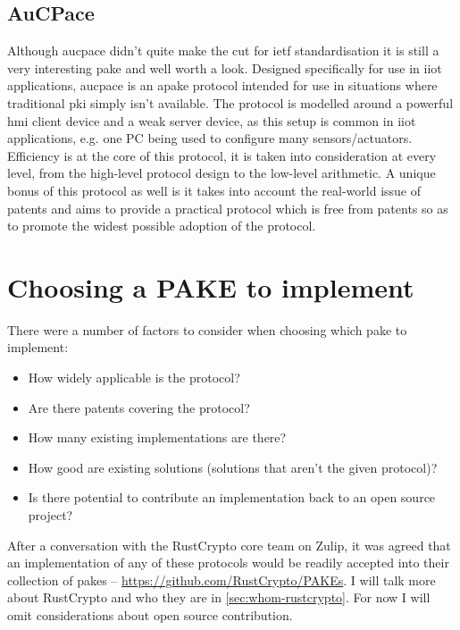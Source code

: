\subsection{AuCPace}
Although \gls{aucpace} \cite{aucpace} didn't quite make the cut for \gls{ietf} standardisation it is still a very interesting \gls{pake} and well worth a look.
Designed specifically for use in \gls{iiot} applications, \gls{aucpace} is an \gls{apake} protocol intended for use in situations where traditional \gls{pki} simply isn't available.
The protocol is modelled around a powerful \gls{hmi} client device and a weak server device, as this setup is common in \gls{iiot} applications, e.g. one PC being used to configure many sensors/actuators.
Efficiency is at the core of this protocol, it is taken into consideration at every level, from the high-level protocol design to the low-level arithmetic.
A unique bonus of this protocol as well is it takes into account the real-world issue of patents and aims to provide a practical protocol which is free from patents so as to promote the widest possible adoption of the protocol.

\clearpage
\section{Choosing a PAKE to implement}
There were a number of factors to consider when choosing which \gls{pake} to implement:
\begin{itemize}
  \item{How widely applicable is the protocol?}
  \item{Are there patents covering the protocol?}
  \item{How many existing implementations are there?}
  \item{How good are existing solutions (solutions that aren't the given protocol)?}
  \item{Is there potential to contribute an implementation back to an open source project?}
\end{itemize}

After a conversation with the RustCrypto core team on Zulip, it was agreed that an implementation of any of these protocols would be readily accepted into their collection of \glspl{pake} -- \url{https://github.com/RustCrypto/PAKEs}.
I will talk more about RustCrypto and who they are in \cref{sec:whom-rustcrypto}.
For now I will omit considerations about open source contribution.

